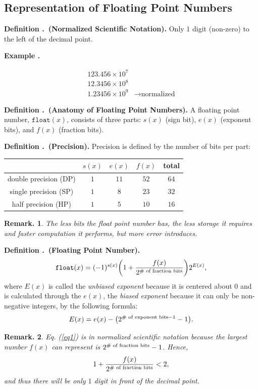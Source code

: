 \documentclass[12pt, a4paper]{article}
\newcounter{index}[subsection]
\newenvironment*{df}[1]{\par\noindent\textbf{Definition \thesubsection.\stepcounter{index}\theindex\ (#1).}}{\par}
\newenvironment*{eg}[1]{\begin{framed}\par\noindent\textbf{Example \thesubsection.\stepcounter{index}\theindex\ #1} \par}{\par\end{framed}}
\newtheorem*{rmk}{Remark.}
\begin{document}
\subsection{Representation of Floating Point Numbers}
\begin{df}{Normalized Scientific Notation}
	Only $1$ digit (non-zero) to the left of the decimal point.	
\end{df}
\begin{eg}{}
	\[\begin{aligned}123.456\times10^7&\\12.3456\times10^8&\\1.23456\times10^9&\rightarrow\text{normalized}\end{aligned}\]	
\end{eg}
\begin{df}{Anatomy of Floating Point Numbers}
	A floating point number, $\texttt{float}(x)$, consists of three parts: $s(x)$ (sign bit), $e(x)$ (exponent bits), and $f(x)$ (fraction bits).
\end{df}
\begin{df}{Precision}
	Precision is defined by the number 	of bits per part:
	\begin{center}\begin{tabular}{c|c|c|c|c}
	&$s(x)$&$e(x)$&$f(x)$&total\\\hline
	double precision (DP)&$1$&$11$&$52$&$64$\\
	single precision (SP)&$1$&$8$&$23$&$32$\\
	half precision (HP)&$1$&$5$&$10$&$16$\\
	\end{tabular}\end{center}
	\begin{rmk}The less bits the float point number has, the less storage it requires and faster computation it performs, but more error introduces.\end{rmk}
\end{df}
\begin{df}{Floating Point Number}
	\begin{equation}\label{eq1}\texttt{float}(x)=(-1)^{s(x)}\qty(1+\dfrac{f(x)}{2^\text{\# of fraction bits}})2^{E(x)},\end{equation} where $E(x)$ is called the \textit{unbiased exponent} because it is centered about $0$ and is calculated through the $e(x)$, the \textit{biased exponent} because it can only be non-negative integers, by the following formula: \[E(x)=e(x)-\qty(2^{\text{\# of exponent bits}-1}-1).\]	
	\begin{rmk}
		Eq. (\ref{eq1}) is in normalized scientific notation because the largest number $f(x)$ can represent is $2^\textnormal{\# of fraction bits}-1$. Hence, \[1+\dfrac{f(x)}{2^\textnormal{\# of fraction bits}}<2,\] and thus there will be only $1$ digit in front of the decimal point.
	\end{rmk}
\end{df}
\end{document}
